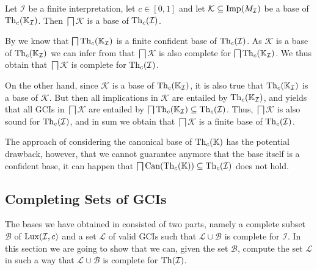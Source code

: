 \begin{Corollary}
  \label{cor:bases-of-implications-to-bases-of-gcis}
  Let $\mathcal{I}$ be a finite interpretation, let $c \in [0,1]$ and let $\mathcal{K}
  \subseteq \operatorname{Imp}(M_{\mathcal{I}})$ be a base of $\operatorname{Th}_c({\mathbb{K}}_{\mathcal{I}})$.  Then
  $\bigsqcap \mathcal{K}$ is a base of $\operatorname{Th}_c(\mathcal{I})$.
\end{Corollary}
\begin{Proof}
  By  we know that
  $\bigsqcap \operatorname{Th}_c({\mathbb{K}}_{\mathcal{I}})$ is a finite confident base of
  $\operatorname{Th}_c(\mathcal{I})$.  As $\mathcal{K}$ is a base of $\operatorname{Th}_c({\mathbb{K}}_{\mathcal{I}})$ we
  can infer from  that
  $\bigsqcap \mathcal{K}$ is also complete for $\bigsqcap \operatorname{Th}_c({\mathbb{K}}_{\mathcal{I}})$.
  We thus obtain that $\bigsqcap \mathcal{K}$ is complete for $\operatorname{Th}_c(\mathcal{I})$.

  On the other hand, since $\mathcal{K}$ is a base of $\operatorname{Th}_c({\mathbb{K}}_{\mathcal{I}})$, it is
  also true that $\operatorname{Th}_c({\mathbb{K}}_{\mathcal{I}})$ is a base of $\mathcal{K}$.  But then all
  implications in $\mathcal{K}$ are entailed by $\operatorname{Th}_c({\mathbb{K}}_{\mathcal{I}})$, and
   yields that all GCIs in
  $\bigsqcap \mathcal{K}$ are entailed by $\bigsqcap \operatorname{Th}_c({\mathbb{K}}_{\mathcal{I}}) \subseteq
  \operatorname{Th}_c(\mathcal{I})$.  Thus, $\bigsqcap \mathcal{K}$ is also sound for
  $\operatorname{Th}_c(\mathcal{I})$, and in sum we obtain that $\bigsqcap \mathcal{K}$ is a finite base
  of $\operatorname{Th}_c(\mathcal{I})$.
\end{Proof}

The approach of considering the canonical base of $\operatorname{Th}_c({\mathbb{K}})$ has the potential
drawback, however, that we cannot guarantee anymore that the base itself is a confident
base, \ie it can happen that $\bigsqcap \operatorname{Can}(\operatorname{Th}_c({\mathbb{K}})) \subseteq \operatorname{Th}_c(\mathcal{I})$
does not hold.

\subsection{Completing Sets of GCIs}
\label{sec:completing-sets-of-gcis}

The bases we have obtained in  consisted of
two parts, namely a complete subset $\mathcal{B}$ of $\operatorname{Lux}(\mathcal{I}, c)$ and a set
$\mathcal{L}$ of valid GCIs such that $\mathcal{L} \cup \mathcal{B}$ is complete for
$\mathcal{I}$.  In this section we are going to show that we can, given the set
$\mathcal{B}$, compute the set $\mathcal{L}$ in such a way that $\mathcal{L} \cup
\mathcal{B}$ is complete for $\operatorname{Th}(\mathcal{I})$.

